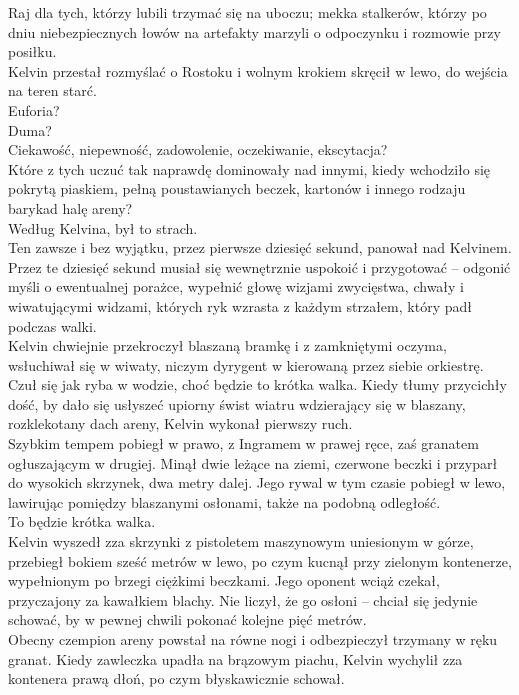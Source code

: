 \documentclass[../MAIN.tex]{subfiles}
\begin{document}
Raj dla tych, którzy lubili trzymać się na uboczu; mekka stalkerów, którzy po dniu niebezpiecznych łowów na artefakty marzyli o odpoczynku i rozmowie przy posiłku.\\
Kelvin przestał rozmyślać o Rostoku i wolnym krokiem skręcił w lewo, do wejścia na teren starć.\\
Euforia?\\
Duma?\\
Ciekawość, niepewność, zadowolenie, oczekiwanie, ekscytacja?\\
Które z tych uczuć tak naprawdę dominowały nad innymi, kiedy wchodziło się pokrytą piaskiem, pełną poustawianych beczek, kartonów i innego rodzaju barykad halę areny?\\
Według Kelvina, był to strach.\\
Ten zawsze i bez wyjątku, przez pierwsze dziesięć sekund, panował nad Kelvinem. Przez te dziesięć sekund musiał się wewnętrznie uspokoić i przygotować -- odgonić myśli o ewentualnej porażce, wypełnić głowę wizjami zwycięstwa, chwały i wiwatującymi widzami, których ryk wzrasta z każdym strzałem, który padł podczas walki.\\
Kelvin chwiejnie przekroczył blaszaną bramkę i z zamkniętymi oczyma, wsłuchiwał się w wiwaty, niczym dyrygent w kierowaną przez siebie orkiestrę. Czuł się jak ryba w wodzie, choć będzie to krótka walka.
Kiedy tłumy przycichły dość, by dało się usłyszeć upiorny świst wiatru wdzierający się w blaszany, rozklekotany dach areny, Kelvin wykonał pierwszy ruch.\\
Szybkim tempem pobiegł w prawo, z Ingramem w prawej ręce, zaś granatem ogłuszającym w drugiej. Minął dwie leżące na ziemi, czerwone beczki i przyparł do wysokich skrzynek, dwa metry dalej. Jego rywal w tym czasie pobiegł w lewo, lawirując pomiędzy blaszanymi osłonami, także na podobną odległość.\\
To będzie krótka walka.\\
Kelvin wyszedł zza skrzynki z pistoletem maszynowym uniesionym w górze, przebiegł bokiem sześć metrów w lewo, po czym kucnął przy zielonym kontenerze, wypełnionym po brzegi ciężkimi beczkami. Jego oponent wciąż czekał, przyczajony za kawałkiem blachy. Nie liczył, że go osłoni -- chciał się jedynie schować, by w pewnej chwili pokonać kolejne pięć metrów.\\
Obecny czempion areny powstał na równe nogi i odbezpieczył trzymany w ręku granat. Kiedy zawleczka upadła na brązowym piachu, Kelvin wychylił zza kontenera prawą dłoń, po czym błyskawicznie schował.\\
\end{document}
